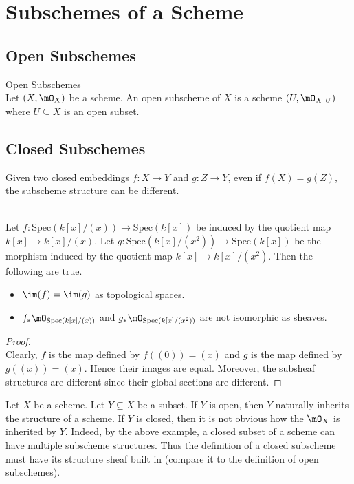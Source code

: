 \documentclass[a4paper]{article}
\begin{document}
\pagebreak
\section{Subschemes of a Scheme}
\subsection{Open Subschemes}
\begin{defn}{Open Subschemes}{}\\
Let $(X,\mO_X)$ be a scheme. An open subscheme of $X$ is a scheme $(U,\mO_X|_U)$ where $U\subseteq X$ is an open subset. 
\end{defn}

\subsection{Closed Subschemes}
Given two closed embeddings $f:X\to Y$ and $g:Z\to Y$, even if $f(X)=g(Z)$, the subscheme structure can be different. 

\begin{eg}{}{}\\
Let $f:\text{Spec}(k[x]/(x))\to\text{Spec}(k[x])$ be induced by the quotient map $k[x]\to k[x]/(x)$. Let $g:\text{Spec}(k[x]/(x^2))\to\text{Spec}(k[x])$ be the morphism induced by the quotient map $k[x]\to k[x]/(x^2)$. Then the following are true. 
\begin{itemize}
\item $\im(f)=\im(g)$ as topological spaces. 
\item $f_\ast\mO_{\text{Spec}(k[x]/(x))}$ and $g_\ast\mO_{\text{Spec}(k[x]/(x^2))}$ are not isomorphic as sheaves. 
\end{itemize}
\begin{proof}\\
Clearly, $f$ is the map defined by $f((0))=(x)$ and $g$ is the map defined by $g((x))=(x)$. Hence their images are equal. Moreover, the subsheaf structures are different since their global sections are different. 
\end{proof}
\end{eg}

Let $X$ be a scheme. Let $Y\subseteq X$ be a subset. If $Y$ is open, then $Y$ naturally inherits the structure of a scheme. If $Y$ is closed, then it is not obvious how the $\mO_X$ is inherited by $Y$. Indeed, by the above example, a closed subset of a scheme can have multiple subscheme structures. Thus the definition of a closed subscheme must have its structure sheaf built in (compare it to the definition of open subschemes). 
\end{document}
